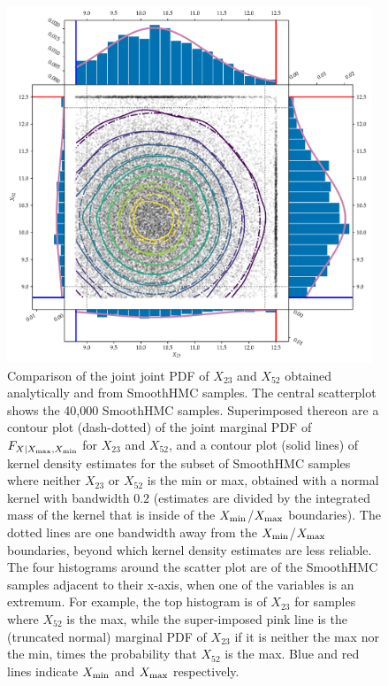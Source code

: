 \documentclass[12pt]{article}
\begin{document}
\begin{figure}[tbp]
\centering
\includegraphics[width=0.97\textwidth,height=0.7\textheight,keepaspectratio]{../figures/toy_joint.pdf}
\caption{\label{fig:toy_joint}
Comparison of the joint joint PDF of \(X_{23}\) and \(X_{52}\)
obtained analytically and from SmoothHMC samples.
The central scatterplot shows the 40,000 SmoothHMC samples.
Superimposed thereon are a contour plot (dash-dotted) of the joint marginal PDF of \(F_{X \mid X_{\max},X_{\min}}\) for \(X_{23}\) and \(X_{52}\),
and a contour plot (solid lines) of kernel density estimates for the subset of SmoothHMC samples where neither \(X_{23}\) or \(X_{52}\) is the min or max,
obtained with a normal kernel with bandwidth \(0.2\)
(estimates are divided by the integrated mass of the kernel that is inside of the \(X_{\min}\)/\(X_{\max}\) boundaries).
The dotted lines are one bandwidth away from the \(X_{\min}\)/\(X_{\max}\) boundaries, beyond which kernel density estimates are less reliable.
The four histograms around the scatter plot are of the SmoothHMC samples adjacent to their x-axis, when one of the variables is an extremum.
For example, the top histogram is of \(X_{23}\) for samples where \(X_{52}\) is the max, 
while the super-imposed pink line is the (truncated normal) marginal PDF of \(X_{23}\) if it is neither the max nor the min,
times the probability that \(X_{52}\) is the max.
Blue and red lines indicate \(X_{\min}\) and \(X_{\max}\) respectively.
}
\end{figure}
    
\end{document}
